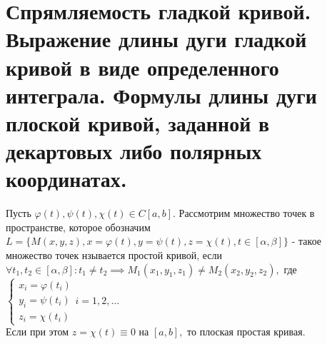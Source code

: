 \documentclass[../main.tex]{subfiles}
\begin{document}
\section{Спрямляемость гладкой кривой. Выражение длины дуги гладкой кривой в виде определенного интеграла. Формулы длины дуги плоской кривой, заданной в декартовых либо полярных координатах.}
\begin{definition}
    Пусть $\varphi(t),\psi(t),\chi(t)\in C[a,b].$ Рассмотрим множество точек в пространстве, которое обозначим $L=\{M(x,y,z), x=\varphi(t),y=\psi(t),z=\chi(t),t\in[\alpha,\beta]\}$ - такое множество точек нзывается простой кривой, если
    $ \forall t_{1},t_{2}\in[\alpha,\beta] : t_{1}\neq t_{2}\implies M_{1}(x_{1},y_{1},z_{1})\neq M_{2}(x_{2},y_{2},z_{2}),$ где $\begin{cases}x_{i}=\varphi(t_{i})\\ y_{i}=\psi(t_{i})\\z_{i}=\chi(t_{i})\end{cases}i=1,2,\dots$
   \\ Если при этом $z=\chi(t) \equiv 0 \text{ на }[a,b],$ то плоская простая кривая.
\end{definition}
\end{document}
